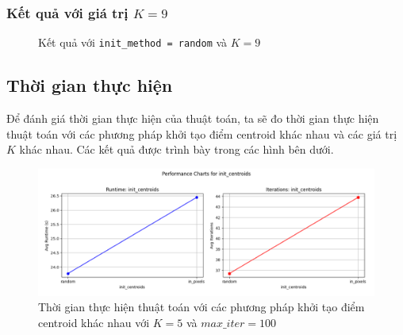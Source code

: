 \subsubsection{Kết quả với giá trị $K = 9$}
\begin{figure}[H]
	\centering
	\qquad
	\caption{Kết quả với \texttt{init\_method = random} và $K = 9$}%
\end{figure}

\subsection{Thời gian thực hiện}

Để đánh giá thời gian thực hiện của thuật toán, ta sẽ đo thời gian thực hiện thuật toán với các phương pháp khởi tạo điểm centroid khác nhau và các giá trị $K$ khác nhau. Các kết quả được trình bày trong các hình bên dưới.
\begin{figure}[H]
	\centering
	\includegraphics[width=\textwidth]{images/res/performance_init_centroids.png}
	\caption{Thời gian thực hiện thuật toán với các phương pháp khởi tạo điểm centroid khác nhau với $K = 5$ và $max\_iter = 100$}
\end{figure}

